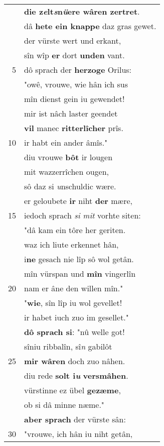 \documentclass[8pt,a4paper,notitlepage]{article}
\begin{document}
\begin{table}[ht]
\begin{minipage}[t]{0.5\linewidth}
\begin{tabular}{rl}
 & \textbf{die z\textit{e}lt\textit{s}n\textit{ü}ere wâren zertret}.\\ 
 & dâ \textbf{hete ein knappe} daz gras gewet.\\ 
 & der vürste wert und erkant,\\ 
 & sîn wîp \textbf{er} dort \textbf{unden} vant.\\ 
5 & dô sprach der \textbf{herzoge} Orilus:\\ 
 & "owê, vrouwe, wie hân ich sus\\ 
 & mîn dienst gein iu gewendet!\\ 
 & mir ist nâch laster geendet\\ 
 & \textbf{vil} manec \textbf{ritterlîcher} prîs.\\ 
10 & ir habt ein ander âmîs."\\ 
 & diu vrouwe \textbf{bôt} ir lougen\\ 
 & mit wazzerrîchen ougen,\\ 
 & sô daz si \textit{u}nschuldic wære.\\ 
 & er geloubete \textbf{ir} niht \textbf{der} mære,\\ 
15 & iedoch sprach \textit{si mit} vorhte siten:\\ 
 & "dâ kam ein tôre her geriten.\\ 
 & waz ich liute erkennet hân,\\ 
 & i\textbf{ne} gesach nie lîp sô wol getân.\\ 
 & mîn vürspan und \textbf{mîn} vingerlîn\\ 
20 & nam er âne den willen mîn."\\ 
 & "\textbf{wie}, sîn lîp iu wol gevellet!\\ 
 & ir habet iuch zuo im gesellet."\\ 
 & \textbf{dô sprach si}: "nû welle got!\\ 
 & sîniu ribbalîn, sî\textit{n} gabilôt\\ 
25 & \textbf{mir wâren} doch zuo nâhen.\\ 
 & diu rede \textbf{solt i\textit{u}} \textbf{versmâhen}.\\ 
 & vürstinne ez übel \textbf{gezæme},\\ 
 & ob si dâ minne næme."\\ 
 & \textbf{aber sprach} der vürste sân:\\ 
30 & "vrouwe, ich hân iu niht getân,\\ 
\end{tabular}

\end{minipage}
\end{table}
\end{document}

